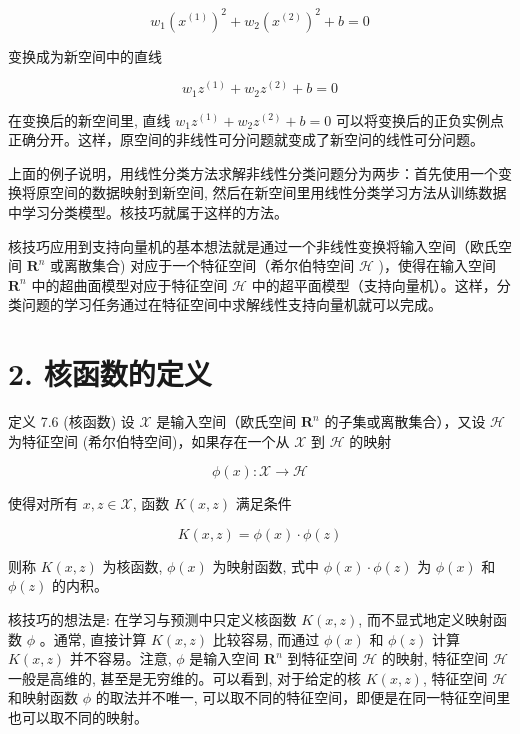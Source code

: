 \documentclass[10pt]{article}
\begin{document}
$$
w_{1}\left(x^{(1)}\right)^{2}+w_{2}\left(x^{(2)}\right)^{2}+b=0
$$

变换成为新空间中的直线

$$
w_{1} z^{(1)}+w_{2} z^{(2)}+b=0
$$

在变换后的新空间里, 直线 $w_{1} z^{(1)}+w_{2} z^{(2)}+b=0$ 可以将变换后的正负实例点正确分开。这样，原空间的非线性可分问题就变成了新空问的线性可分问题。

上面的例子说明，用线性分类方法求解非线性分类问题分为两步：首先使用一个变换将原空间的数据映射到新空间, 然后在新空间里用线性分类学习方法从训练数据中学习分类模型。核技巧就属于这样的方法。

核技巧应用到支持向量机的基本想法就是通过一个非线性变换将输入空间（欧氏空间 $\boldsymbol{R}^{n}$ 或离散集合) 对应于一个特征空间（希尔伯特空间 $\mathcal{H}$ )，使得在输入空间 $\boldsymbol{R}^{n}$ 中的超曲面模型对应于特征空间 $\mathcal{H}$ 中的超平面模型（支持向量机）。这样，分类问题的学习任务通过在特征空间中求解线性支持向量机就可以完成。

\section*{2. 核函数的定义}
定义 7.6 (核函数) 设 $\mathcal{X}$ 是输入空间（欧氏空间 $\boldsymbol{R}^{n}$ 的子集或离散集合），又设 $\mathcal{H}$ 为特征空间 (希尔伯特空间)，如果存在一个从 $\mathcal{X}$ 到 $\mathcal{H}$ 的映射


\begin{equation*}
\phi(x): \mathcal{X} \rightarrow \mathcal{H} \tag{7.65}
\end{equation*}


使得对所有 $x, z \in \mathcal{X}$, 函数 $K(x, z)$ 满足条件


\begin{equation*}
K(x, z)=\phi(x) \cdot \phi(z) \tag{7.66}
\end{equation*}


则称 $K(x, z)$ 为核函数, $\phi(x)$ 为映射函数, 式中 $\phi(x) \cdot \phi(z)$ 为 $\phi(x)$ 和 $\phi(z)$ 的内积。

核技巧的想法是: 在学习与预测中只定义核函数 $K(x, z)$, 而不显式地定义映射函数 $\phi$ 。通常, 直接计算 $K(x, z)$ 比较容易, 而通过 $\phi(x)$ 和 $\phi(z)$ 计算 $K(x, z)$ 并不容易。注意, $\phi$ 是输入空间 $\boldsymbol{R}^{n}$ 到特征空间 $\mathcal{H}$ 的映射, 特征空间 $\mathcal{H}$ 一般是高维的, 甚至是无穷维的。可以看到, 对于给定的核 $K(x, z)$, 特征空间 $\mathcal{H}$ 和映射函数 $\phi$ 的取法并不唯一, 可以取不同的特征空间，即便是在同一特征空间里也可以取不同的映射。
\end{document}
